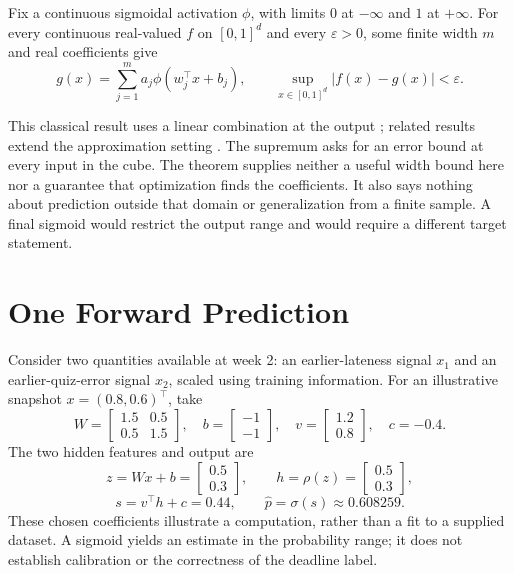 \par\medskip\noindent\begin{minipage}{\linewidth}
\begin{theorem}
Fix a continuous sigmoidal activation $\phi$, with limits $0$ at $-\infty$ and $1$ at $+\infty$. For every continuous real-valued $f$ on $[0,1]^d$ and every $\varepsilon>0$, some finite width $m$ and real coefficients give
\[
g(x)=\sum_{j=1}^{m}a_j\phi(w_j^\top x+b_j),
\qquad
\sup_{x\in[0,1]^d}|f(x)-g(x)|<\varepsilon.
\]
\end{theorem}
\end{minipage}\par\medskip
This classical result uses a linear combination at the output \citep{cybenko1989}; related results extend the approximation setting \citep{hornik1989}. The supremum asks for an error bound at every input in the cube. The theorem supplies neither a useful width bound here nor a guarantee that optimization finds the coefficients. It also says nothing about prediction outside that domain or generalization from a finite sample. A final sigmoid would restrict the output range and would require a different target statement.

\section{One Forward Prediction}

Consider two quantities available at week 2: an earlier-lateness signal $x_1$ and an earlier-quiz-error signal $x_2$, scaled using training information. For an illustrative snapshot $x=(0.8,0.6)^\top$, take
\[
W=\begin{bmatrix}1.5&0.5\\0.5&1.5\end{bmatrix},
\quad b=\begin{bmatrix}-1\\-1\end{bmatrix},
\quad v=\begin{bmatrix}1.2\\0.8\end{bmatrix},
\quad c=-0.4.
\]
The two hidden features and output are
\[
z=Wx+b=\begin{bmatrix}0.5\\0.3\end{bmatrix},
\qquad h=\rho(z)=\begin{bmatrix}0.5\\0.3\end{bmatrix},
\]
\[
s=v^\top h+c=0.44,
\qquad \hat p=\sigma(s)\approx0.608259.
\]
These chosen coefficients illustrate a computation, rather than a fit to a supplied dataset. A sigmoid yields an estimate in the probability range; it does not establish calibration or the correctness of the deadline label.

